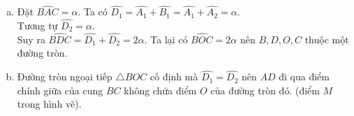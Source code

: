\begin{bt}
{\begin{center}
		\end{center}
		\begin{enumerate}[a)]
			\item Đặt $\widehat{BAC}=\alpha.$ Ta có $\widehat{D_1}=\widehat{A_1}+\widehat{B_1}=\widehat{A_1}+\widehat{A_2}=\alpha.$\\
			Tương tự $\widehat{D_2}=\alpha.$\\
			Suy ra $\widehat{BDC}=\widehat{D_1}+\widehat{D_2}=2\alpha.$ Ta lại có $\widehat{BOC}=2\alpha$ nên $B,D,O,C$ thuộc một đường tròn.
			\item Đường tròn ngoại tiếp $\triangle BOC$ cố định mà $\widehat{D_1}=\widehat{D_2}$ nên $AD$ đi qua điểm chính giữa của cung $BC$ không chứa điểm $O$ của đường tròn đó. (điểm $M$ trong hình vẽ).
		\end{enumerate}    
	}
\end{bt}
